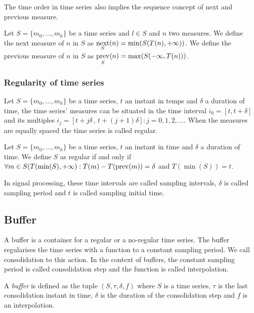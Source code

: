 The time order in time series also implies the sequence concept of
next and previous measure.

\begin{definition}
  Let $S=\{m_0, \ldots, m_k\}$ be a time series and $l\in S$ and $n$
  two measures. We define the next measure of $n$ in $S$ as
  $\operatorname*{next}\limits_S(n) = \min(S(T(n),+\infty))$. We define the previous
  measure of $n$ in $S$ as $\operatorname*{prev}\limits_S(n) =
  \max(S(-\infty,T(n)))$.
\end{definition}




\subsubsection{Regularity of time series} 

Let $S=\{m_0,\ldots,m_k\}$ be a time series, $t$ an instant in temps
and $\delta$ a duration of time, the time series' measures can be
situated in the time interval $i_0=[t,t+\delta]$ and its multiples
$i_j=[t+j\delta \,,\, t+(j+1)\delta]: j=0,1,2,\ldots$. When the
measures are equally spaced the time series is called regular.

\begin{definition}
  Let $S=\{m_0,\ldots,m_k\}$ be a time series, $t$ an instant in time
  and $\delta$ a duration of time. We define $S$ as regular if and
  only if $\forall m \in S(T(\min(S),+\infty):T(m) - T(\operatorname*{prev}(m)) =
  \delta$ and $T(\min(S))=t$.
\end{definition}

In signal processing, these time intervals are called sampling
intervals, $\delta$ is called sampling period and $t$ is called
sampling initial time.  


\subsection{Buffer}\label{sec:model:buffer}

A buffer is a container for a regular or a no-regular time series. The
buffer regularises the time series with a function to a constant
sampling period. We call consolidation to this action. In the context
of buffers, the constant sampling period is called consolidation step
and the function is called interpolation.

\begin{definition}[Buffer]
  A \emph{buffer} is defined as the tuple $(S,\tau,\delta,f)$ where
  $S$ is a time series, $\tau$ is the last consolidation instant in
  time, $\delta$ is the duration of the consolidation step and $f$ is
  an interpolation.
\end{definition}

